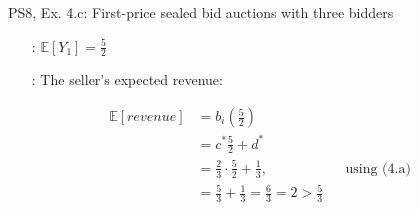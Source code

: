 \begin{frame}{PS8, Ex. 4.c: First-price sealed bid auctions with three bidders}
\begin{multicols}{2}
\begin{itemize}
        \item[\nth{1}:] $\mathbb{E}[Y_1]=\frac{5}{2}$
        \item[\nth{2}:] The seller's expected revenue:
      \end{itemize} \vspace{-12pt}
      \begin{align*}
        \mathbb{E}[revenue]&=b_i\left(\frac{5}{2}\right)\\
                           &= c^*\frac{5}{2}+d^*\\
                           &= \frac{2}{3}\cdot\frac{5}{2}+\frac{1}{3},&&\text{using (4.a)}\\
                           &= \frac{5}{3}+\frac{1}{3}=\frac{6}{3}=2>\frac{5}{3}
      \end{align*}
      \vfill\null
    \end{multicols}
    \vfill\null
\end{frame}
